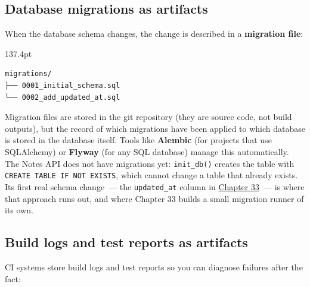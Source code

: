 \subsection*{Database migrations as artifacts}\label{19-artifact-storage:database-migrations-as-artifacts}

When the database schema changes, the change is described in a \textbf{migration file}:

\begin{diagrambox}[short]{137.4pt}
\begin{Verbatim}[fontsize=\fontsize{9.0}{8.55}\selectfont]
migrations/
├── 0001_initial_schema.sql
└── 0002_add_updated_at.sql
\end{Verbatim}
\end{diagrambox}

\noindent{}Migration files are stored in the git repository (they are source code, not build outputs), but the record of which migrations have been applied to which database is stored in the database itself. Tools like \textbf{Alembic} (for projects that use SQLAlchemy) or \textbf{Flyway} (for any SQL database) manage this automatically. The Notes API does not have migrations yet: \texttt{init\_db()} creates the table with \texttt{CREATE\ TABLE\ IF\ NOT\ EXISTS}, which cannot change a table that already exists. Its first real schema change~--- the \texttt{updated\_at} column in \hyperref[ch:33-logic-execution]{Chapter 33}~--- is where that approach runs out, and where Chapter 33 builds a small migration runner of its own.

\subsection*{Build logs and test reports as artifacts}\label{19-artifact-storage:build-logs-and-test-reports-as-artifacts}

CI systems store build logs and test reports so you can diagnose failures after the fact:

